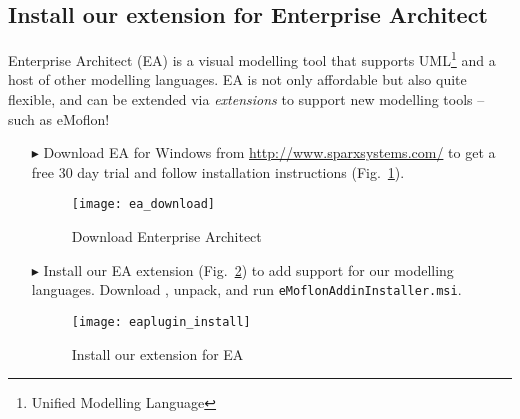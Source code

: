 \newpage

\visHeader
\subsection{Install our extension for Enterprise Architect}

Enterprise Architect (EA) is a visual modelling tool that supports UML\footnote{Unified Modelling Language} and a host of other modelling languages.
EA is not only affordable but also quite flexible, and can be extended via \emph{extensions} to support new modelling tools -- such as eMoflon!

\begin{itemize}
\item[$\blacktriangleright$] Download\hypertarget{installEA vis}{} EA for Windows from \url{http://www.sparxsystems.com/} to get a free 30 day trial and follow
installation instructions (Fig.~\ref{enterpriseArchitextHomepage}).

\begin{figure}[htbp]
	\centering
  	\texttt{[image: ea\_download]}
	\caption{Download Enterprise Architect}
	\label{enterpriseArchitextHomepage}
\end{figure} 

\item[$\blacktriangleright$] Install our EA extension (Fig.~\ref{eaPluginWizard}) to add support for our modelling languages.
Download \EAExtensionLink, unpack, and run \texttt{eMoflonAddinInstaller.msi}.

\begin{figure}[htbp]
	\centering
  \texttt{[image: eaplugin\_install]}
	\caption{Install our extension for EA}
	\label{eaPluginWizard}
\end{figure}
\end{itemize}